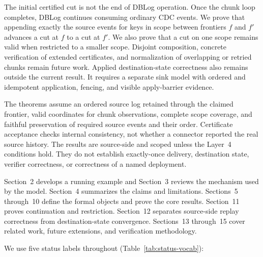 \documentclass[letterpaper,10pt,twocolumn]{article}
\begin{document}
\begin{figure}[t]
  
\end{figure}

The initial certified cut is not the end of DBLog operation. Once the
chunk loop completes, DBLog continues consuming ordinary CDC events. We
prove that appending exactly the source events for keys in scope between
frontiers $f$ and $f'$ advances a cut at $f$ to a cut at $f'$. We also
prove that a cut on one scope remains valid when restricted to a smaller
scope. Disjoint composition, concrete verification of extended
certificates, and normalization of overlapping or retried chunks remain
future work. Applied destination-state correctness also remains outside
the current result. It requires a separate sink model with ordered and
idempotent application, fencing, and visible apply-barrier evidence.

The theorems assume an ordered source log retained through the claimed
frontier, valid coordinates for chunk observations, complete scope
coverage, and faithful preservation of required source events and their
order. Certificate acceptance checks internal consistency, not whether
a connector reported the real source history. The results are
source-side and scoped unless the Layer~4 conditions hold. They do not
establish exactly-once delivery, destination state, verifier
correctness, or correctness of a named deployment.

Section~2 develops a running example and Section~3 reviews the mechanism
used by the model. Section~4 summarizes the claims and limitations.
Sections~5 through~10 define the formal objects and prove the core
results. Section~11 proves continuation and restriction. Section~12
separates source-side replay correctness from destination-state
convergence. Sections~13 through~15 cover related work, future
extensions, and verification methodology.

We use five status labels throughout
(Table~\ref{tab:status-vocab}):
\end{document}
